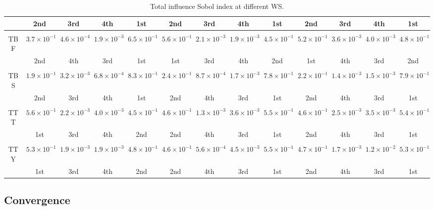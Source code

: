 \documentclass[preprint,12pt]{elsarticle}
\begin{document}
\begin{table}[!h]
\begin{centering}
{\begin{tabular}{c|cccc|cccc|cccc}
 &  2nd & 3rd & 4th & 1st &  2nd & 3rd & 4th & 1st & 2nd & 3rd & 4th & 1st \\
\hline
&&&&&&&&&&&&\\[-1em]
TBF &  $3.7\times 10^{-1}$ & $4.6\times 10^{-4}$ & $1.9\times 10^{-3}$ &     $6.5\times 10^{-1}$ &  $5.6\times 10^{-1}$ & $2.1\times 10^{-3}$ & $1.9\times 10^{-3}$ &     $4.5\times 10^{-1}$  &  $5.2\times 10^{-1}$ & $3.6\times 10^{-3}$ & $4.0\times 10^{-3}$ &     $4.8\times 10^{-1}$ \\
 &  2nd & 4th & 3rd & 1st &  1st & 3rd & 4th & 2nd & 1st & 4th & 3rd & 2nd \\
\hline
&&&&&&&&&&&&\\[-1em]
TBS &  $1.9\times 10^{-1}$ & $3.2\times 10^{-3}$ & $6.8\times 10^{-4}$ &     $8.3\times 10^{-1}$ &  $2.4\times 10^{-1}$ & $8.7\times 10^{-4}$ & $1.7\times 10^{-3}$ &     $7.8\times 10^{-1}$  &  $2.2\times 10^{-1}$ & $1.4\times 10^{-3}$ & $1.5\times 10^{-3}$ &     $7.9\times 10^{-1}$ \\
 &  2nd & 3rd & 4th & 1st & 2nd & 4th & 3rd & 1st & 2nd & 4th & 3rd & 1st \\
\hline
&&&&&&&&&&&&\\[-1em]
TTT &  $5.6\times 10^{-1}$ & $2.2\times 10^{-3}$ & $4.0\times 10^{-3}$ &     $4.5\times 10^{-1}$ &  $4.6\times 10^{-1}$ & $1.3\times 10^{-3}$ & $3.6\times 10^{-3}$ &     $5.5\times 10^{-1}$  &  $4.6\times 10^{-1}$ & $2.5\times 10^{-3}$ & $3.5\times 10^{-3}$ &     $5.4\times 10^{-1}$ \\
 &  1st & 3rd & 4th & 2nd &  2nd & 4th & 3rd & 1st & 2nd & 4th & 3rd & 1st \\
\hline
&&&&&&&&&&&&\\[-1em]
TTY &  $5.3\times 10^{-1}$ & $1.9\times 10^{-3}$ & $1.9\times 10^{-3}$ &     $4.8\times 10^{-1}$ &  $4.6\times 10^{-1}$ & $5.6\times 10^{-4}$ & $4.5\times 10^{-3}$ &     $5.5\times 10^{-1}$  &  $4.7\times 10^{-1}$ & $1.7\times 10^{-3}$ & $1.2\times 10^{-2}$ &     $5.3\times 10^{-1}$ \\
 &  1st & 3rd & 4th & 2nd &  2nd & 4th & 3rd & 1st & 2nd & 4th & 3rd & 1st \\
\hline
\end{tabular}}
\caption{Total influence Sobol index at different WS.}
\label{tab_sens_ws}
\end{centering}
\end{table}




\subsection{Convergence}
\label{subsec_Convergence}
\end{document}
